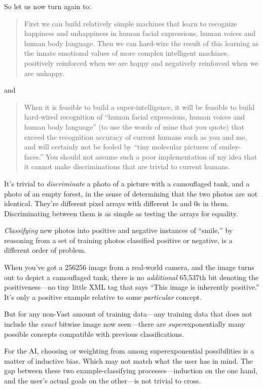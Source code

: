 {
 So let us now turn again to:}

\begin{quote}
{
 First we can build relatively simple machines that learn to
recognize happiness and unhappiness in human facial expressions, human
voices and human body language. Then we can hard-wire the result of
this learning as the innate emotional values of more complex
intelligent machines, positively reinforced when we are happy and
negatively reinforced when we are unhappy.}
\end{quote}

{
 and}

\begin{quote}
{
 When it is feasible to build a super-intelligence, it will be
feasible to build hard-wired recognition of ``human
facial expressions, human voices and human body
language'' (to use the words of mine that you quote)
that exceed the recognition accuracy of current humans such as you and
me, and will certainly not be fooled by ``tiny
molecular pictures of smiley-faces.'' You should not
assume such a poor implementation of my idea that it cannot make
discriminations that are trivial to current humans.}
\end{quote}

{
 It's trivial to \textit{discriminate} a photo of a
picture with a camouflaged tank, and a photo of an empty forest, in the
sense of determining that the two photos are not identical.
They're different pixel arrays with different 1s and 0s
in them. Discriminating between them is as simple as testing the arrays
for equality.}

{
 \textit{Classifying} new photos into positive and negative
instances of ``smile,'' by reasoning
from a set of training photos classified positive or negative, is a
different order of problem.}

{
 When you've got a 256{\texttimes}256 image from a
real-world camera, and the image turns out to depict a camouflaged
tank, there is no \textit{additional} 65,537th bit denoting the
positiveness---no tiny little XML tag that says ``This
image is inherently positive.'' It's
only a positive example relative to some \textit{particular} concept.}

{
 But for any non-Vast amount of training data---any training data
that does not include the \textit{exact} bitwise image now seen---there
are \textit{super}exponentially many possible concepts compatible with
previous classifications.}

{
 For the AI, choosing or weighting from among superexponential
possibilities is a matter of inductive bias. Which may not match what
the user has in mind. The gap between these two example-classifying
processes---induction on the one hand, and the user's
actual goals on the other---is not trivial to cross.}

